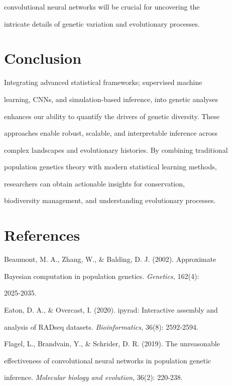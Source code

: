 \documentclass[10pt,twoside]{article}
\numberwithin{equation}{section}
\begin{document}
convolutional neural networks will be crucial for uncovering the

intricate details of genetic variation and evolutionary processes.



\section{Conclusion}



Integrating advanced statistical frameworks; supervised machine

learning, CNNs, and simulation-based inference, into genetic analyses

enhances our ability to quantify the drivers of genetic diversity. These

approaches enable robust, scalable, and interpretable inference across

complex landscapes and evolutionary histories. By combining traditional

population genetics theory with modern statistical learning methods,

researchers can obtain actionable insights for conservation,

biodiversity management, and understanding evolutionary processes.



\section{References}



Beaumont, M. A., Zhang, W., \& Balding, D. J. (2002). Approximate

Bayesian computation in population genetics. \emph{Genetics,} 162(4):

2025-2035.



Eaton, D. A., \& Overcast, I. (2020). ipyrad: Interactive assembly and

analysis of RADseq datasets. \emph{Bioinformatics,} 36(8): 2592-2594.



Flagel, L., Brandvain, Y., \& Schrider, D. R. (2019). The unreasonable

effectiveness of convolutional neural networks in population genetic

inference. \emph{Molecular biology and evolution,} 36(2): 220-238.
\end{document}
